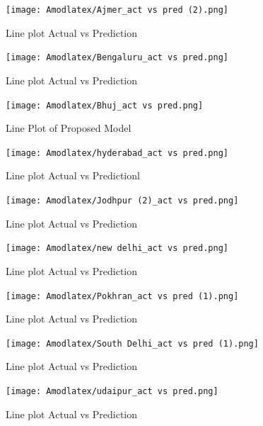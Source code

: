 \documentclass[a4paper,fleqn]{cas-sc}
\begin{document}
\begin{figure}[!ht]
\centering
\texttt{[image: Amodlatex/Ajmer\_act vs pred (2).png]}
\caption{Line plot Actual vs Prediction}
\label{Line plot4}
\end{figure}



\begin{figure}[!ht]
\centering
\texttt{[image: Amodlatex/Bengaluru\_act vs pred.png]}
\caption{Line plot Actual vs Prediction}
\label{Line plot5}
\end{figure}


\begin{figure}[!ht]
\centering
\texttt{[image: Amodlatex/Bhuj\_act vs pred.png]}
\caption{Line Plot of Proposed Model}
\label{Line plot6}
\end{figure}



\begin{figure}[!ht]
\centering
\texttt{[image: Amodlatex/hyderabad\_act vs pred.png]}
\caption{Line plot Actual vs Predictionl}
\label{Line plot7}
\end{figure}



\begin{figure}[!ht]
\centering
\texttt{[image: Amodlatex/Jodhpur (2)\_act vs pred.png]}
\caption{Line plot Actual vs Prediction}
\label{Line plot8}
\end{figure}


\begin{figure}[!ht]
\centering
\texttt{[image: Amodlatex/new delhi\_act vs pred.png]}
\caption{Line plot Actual vs Prediction}
\label{Line plot9}
\end{figure}


\begin{figure}[!ht]
\centering
\texttt{[image: Amodlatex/Pokhran\_act vs pred (1).png]}
\caption{Line plot Actual vs Prediction}
\label{fig:plot}
\end{figure}

\begin{figure}[!ht]
\centering
\texttt{[image: Amodlatex/South Delhi\_act vs pred (1).png]}
\caption{Line plot Actual vs Prediction}
\label{Line plot10}
\end{figure}

\begin{figure}[!ht]
\centering
\texttt{[image: Amodlatex/udaipur\_act vs pred.png]}
\caption{Line plot Actual vs Prediction}
\label{Line plot11}
\end{figure}
\end{document}
